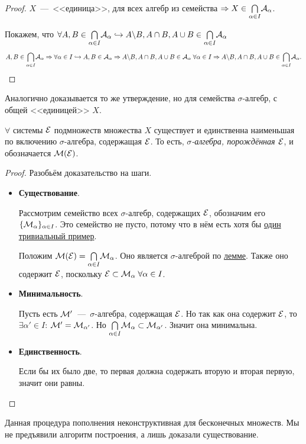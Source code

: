 \begin{proof}
    $X$~---~<<единица>>, для всех алгебр из семейства $\Rightarrow X \in \underset{\alpha \in I}{\bigcap} \mathcal{A}_\alpha$. 
    
    Покажем, что $\forall A, B \in \underset{\alpha \in I}{\bigcap} \mathcal{A}_\alpha \hookrightarrow A \backslash B, A \cap B, A \cup B \in \underset{\alpha \in I}{\bigcap} \mathcal{A}_\alpha$
    $$A, B \in \underset{\alpha \in I}{\bigcap} \mathcal{A}_\alpha \Rightarrow \forall \alpha \in I \hookrightarrow A, B \in \mathcal{A}_\alpha \Rightarrow A \backslash B, A \cap B, A \cup B \in \mathcal{A}_\alpha \; \forall \alpha \in I \Rightarrow A \backslash B, A \cap B, A \cup B \in \underset{\alpha \in I}{\bigcap} \mathcal{A}_\alpha.$$
\end{proof}

\remark Аналогично доказывается то же утверждение, но для семейства $\sigma$-алгебр, с общей <<единицей>> $X$.

\theorem $\forall$ системы $\mathcal{E}$ подмножеств множества $X$ существует и единственна наименьшая по включению $\sigma$-алгебра, содержащая $\mathcal{E}$. То есть, \textit{$\sigma$-алгебра, порождённая $\mathcal{E}$}, и обозначается $\mathcal{M}(\mathcal{E})$.

\begin{proof}
Разобьём доказательство на шаги.
\begin{itemize}
    \item \textbf{Существование}.

    Рассмотрим семейство всех $\sigma$-алгебр, содержащих $\mathcal{E}$, обозначим его $\{\mathcal{M}_\alpha\}_{\alpha \in I}$. Это семейство не пусто, потому что в нём есть хотя бы \hyperlink{TrivialSigma}{один тривиальный пример}.
    
    Положим $\mathcal{M}(\mathcal{E}) = \underset{\alpha \in I}{\bigcap} \mathcal{M}_\alpha$. Оно является $\sigma$-алгеброй по \hyperlink{minimalSigmaAlgebra}{лемме}. Также оно содержит $\mathcal{E}$, поскольку $\mathcal{E} \subset \mathcal{M}_\alpha \; \forall \alpha \in I$. 
    
    \item \textbf{Минимальность}.

    Пусть есть $\mathcal{M}'$~---~$\sigma$-алгебра, содержащая $\mathcal{E}$. Но так как она содержит $\mathcal{E}$, то $\exists \alpha' \in I$: $\mathcal{M}' = \mathcal{M}_{\alpha'}$. Но $\underset{\alpha \in I}{\bigcap} \mathcal{M}_\alpha \subset \mathcal{M}_{\alpha'}$. Значит она минимальна.

    \item \textbf{Единственность}.

    Если бы их было две, то первая должна содержать вторую и вторая первую, значит они равны.
\end{itemize}
\end{proof}
\begin{note}
    Данная процедура пополнения неконструктивная для бесконечных множеств. Мы не предъявили алгоритм построения, а лишь доказали существование.
\end{note}

